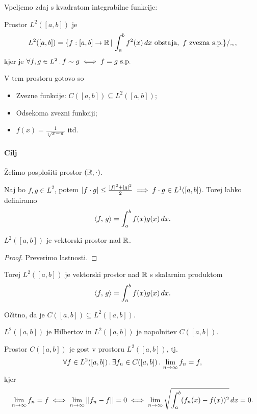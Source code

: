 Vpeljemo zdaj s kvadratom integrabilne funkcije: 
\begin{definicija}
    Prostor \(L^2([a,b])\) je 
    \[L^2([a, b]) = \{f: [a,b] \to \mathbb{R} \,|\, \int_{a}^{b} f^2(x) \, dx \ \text{obstaja}, \ f \ \text{zvezna s.p.}\}/_\sim,\]
    kjer je \(\forall f, g \in L^2 \,.\, f \sim g \iff f = g \ \text{s.p.}\)
\end{definicija}

V tem prostoru gotovo so 
\begin{itemize}
    \item Zvezne funkcije: \(C([a,b]) \subseteq L^2([a,b])\);
    \item Odsekoma zvezni funkciji;
    \item \(f(x) = \frac{1}{\sqrt[4]{x-a}}\) itd.
\end{itemize}

\paragraph{Cilj} Želimo posplošiti prostor \((\mathbb{R}, \cdot)\).

Naj bo \(f, g \in L^2\), potem \(|f \cdot g| \leq \frac{|f|^2 + |g|^2}{2} \implies f \cdot g \in L^1([a, b])\). Torej lahko definiramo 
\[\langle f, \, g \rangle = \int_{a}^{b}f(x)g(x) \, dx.\]

\begin{trditev}
    \(L^2([a,b])\) je vektorski prostor nad \(\mathbb{R}\).
\end{trditev}

\begin{proof}
    Preverimo lastnosti.
\end{proof}

Torej \(L^2([a, b])\) je vektorski prostor nad \(\mathbb{R}\) s skalarnim produktom \[\langle f, \, g \rangle = \int_{a}^{b}f(x)g(x) \, dx.\]

Očitno, da je \(C([a,b]) \subseteq L^2([a, b])\).

\begin{izrek}
    \(L^2([a,b])\) je Hilbertov in \(L^2([a,b])\) je napolnitev \(C([a,b])\).
\end{izrek}

\begin{opomba} Prostor \(C([a, b])\) je gost v prostoru \(L^2([a, b])\), tj.
    \[\forall f \in L^2([a,b]) \,.\, \exists f_n \in C([a,b]) \,.\, \lim_{n \to \infty}  f_n = f,\]
    kjer
    \[
        \lim_{n \to \infty}  f_n = f \iff \lim_{n \to \infty} ||f_n - f|| = 0 \iff \lim_{n \to \infty} \sqrt{\int_{a}^{b}(f_n(x) - f(x))^2} \, dx = 0.
    \]
\end{opomba}

